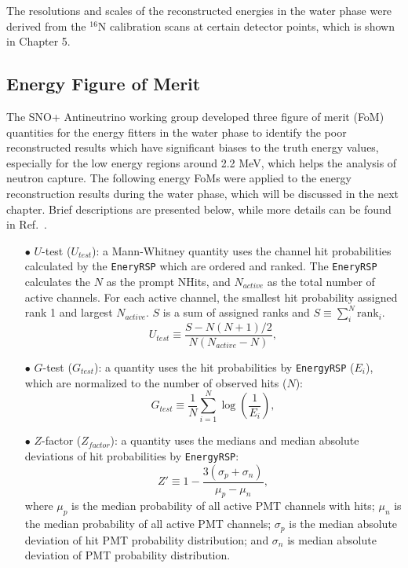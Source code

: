 The resolutions and scales of the reconstructed energies in the water phase were derived from the $^{16}$N calibration scans at certain detector points, which is shown in Chapter 5.

\subsection{Energy Figure of Merit}\label{sect:energy_fom}
The SNO+ Antineutrino working group developed three figure of merit (FoM) quantities for the energy fitters in the water phase to identify the poor reconstructed results which have significant biases to the truth energy values, especially for the low energy regions around 2.2 MeV, which helps the analysis of neutron capture\cite{waterFoM,waterunidoc}. The following energy FoMs were applied to the energy reconstruction results during the water phase, which will be discussed in the next chapter. Brief descriptions are presented below, while more details can be found in Ref.~\cite{waterunidoc}.

\begin{itemize}
	\item[$\bullet$]$U$-test ($U_{test}$):
	a Mann-Whitney quantity uses the channel hit probabilities calculated by the \texttt{EneryRSP} which are ordered and ranked. The \texttt{EneryRSP} calculates the $N$ as the prompt NHits, and $N_{active}$ as the total number of active channels. For each active channel, the smallest hit probability assigned rank 1 and largest $N_{active}$. $S$ is a sum of assigned ranks and $S\equiv \sum_{i}^N \mathrm{rank}_i$.
	\begin{equation}
	U_{test}\equiv \frac{S-N(N+1)/2}{N(N_{active}-N)},
	\end{equation}

	\item[$\bullet$] $G$-test ($G_{test}$):
 	a quantity uses the hit probabilities by \texttt{EnergyRSP} ($E_i$), which are normalized to the number of observed hits ($N$):
	\begin{equation}
	G_{test}\equiv \frac{1}{N}\sum_{i=1}^N \log(\frac{1}{E_i}),
	\end{equation}
	
	\item[$\bullet$] $Z$-factor ($Z_{factor}$):
	a quantity uses the medians and median absolute deviations of hit probabilities by \texttt{EnergyRSP}:
	\begin{equation}
     Z'\equiv 1-\frac{3(\sigma_p+\sigma_n)}{\mu_p-\mu_n},
    \end{equation}
    where $\mu_p$ is the median probability of all active PMT channels with hits; $\mu_n$ is the median probability of all active PMT channels; $\sigma_p$ is the median absolute deviation of hit PMT probability distribution; and
    $\sigma_n$ is median absolute deviation of PMT probability distribution.
\end{itemize}

